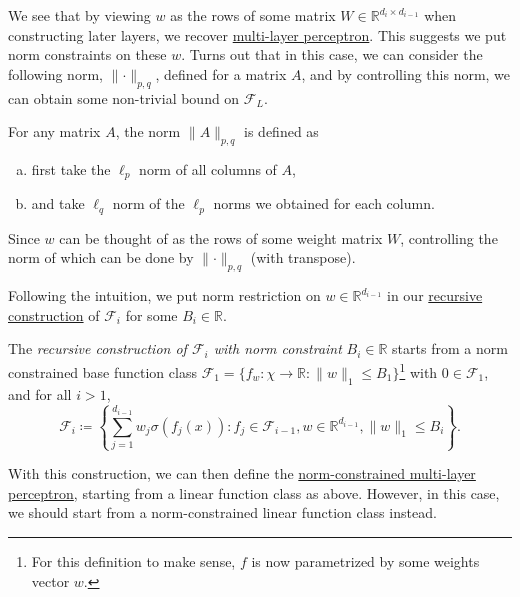 We see that by viewing \(w\) as the rows of some matrix \(W \in \mathbb{R} ^{d_i \times d_{i-1} }\) when constructing later layers, we recover \hyperref[def:MLP]{multi-layer perceptron}. This suggests we put norm constraints on these \(w\). Turns out that in this case, we can consider the following norm, \(\lVert \cdot \rVert _{p, q}\), defined for a matrix \(A\), and by controlling this norm, we can obtain some non-trivial bound on \(\mathscr{F} _L\).

\begin{definition}
	For any matrix \(A\), the norm \(\lVert A \rVert _{p, q}\) is defined as
	\begin{enumerate}[(a)]
		\item first take the \(\ell _p\) norm of all columns of \(A\),
		\item and take \(\ell _q\) norm of the \(\ell _p\) norms we obtained for each column.
	\end{enumerate}
\end{definition}

\begin{intuition}
	Since \(w\) can be thought of as the rows of some weight matrix \(W\), controlling the norm of which can be done by \(\lVert \cdot \rVert _{p, q}\) (with transpose).
\end{intuition}

Following the intuition, we put norm restriction on \(w \in \mathbb{R} ^{d_{i-1}}\) in our \hyperref[def:recursive]{recursive construction} of \(\mathscr{F} _i\) for some \(B_i\in \mathbb{R} \).

\begin{definition}\label{def:norm-recursive}
	The \emph{recursive construction of \(\mathscr{F} _i\) with norm constraint} \(B_i \in \mathbb{R} \) starts from a norm constrained base function class \(\mathscr{F} _1 = \{ f_w \colon \chi \to \mathbb{R} \colon \lVert w \rVert _1 \leq B_1 \} \)\footnote{For this definition to make sense, \(f\) is now parametrized by some weights vector \(w\).} with \(0 \in \mathscr{F} _1\), and for all \(i > 1\),
	\[
		\mathscr{F} _i \coloneqq \left\{ \sum_{j=1}^{d_{i-1} } w_j \sigma (f_j(x)) \colon f_j \in \mathscr{F} _{i-1}, w \in \mathbb{R} ^{d_{i-1}} , \lVert w \rVert _1 \leq B_i\right\}.
	\]
\end{definition}

With this construction, we can then define the \hyperref[def:norm-MLP]{norm-constrained multi-layer perceptron}, starting from a linear function class as above. However, in this case, we should start from a norm-constrained linear function class instead.

